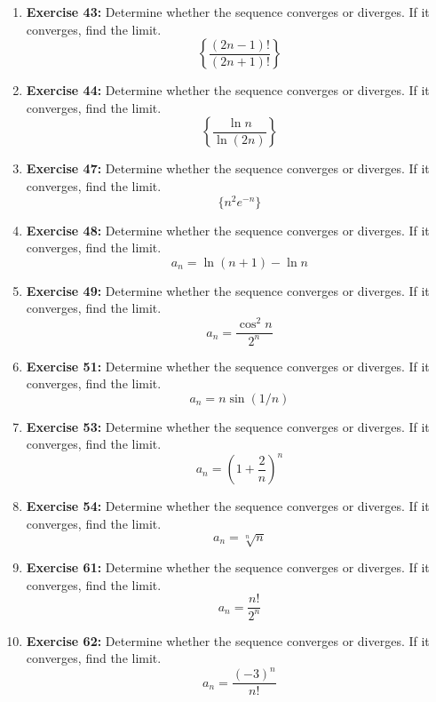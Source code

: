 \documentclass[12pt, a4paper]{article}
\begin{document}
\begin{enumerate}
    \item \textbf{Exercise 43:} Determine whether the sequence converges or diverges. If it converges, find the limit.
    \[ \left\{ \frac{(2n-1)!}{(2n+1)!} \right\} \]
    
    \item \textbf{Exercise 44:} Determine whether the sequence converges or diverges. If it converges, find the limit.
    \[ \left\{ \frac{\ln n}{\ln(2n)} \right\} \]

    \item \textbf{Exercise 47:} Determine whether the sequence converges or diverges. If it converges, find the limit.
    \[ \{ n^2 e^{-n} \} \]
    
    \item \textbf{Exercise 48:} Determine whether the sequence converges or diverges. If it converges, find the limit.
    \[ a_n = \ln(n+1) - \ln n \]

    \item \textbf{Exercise 49:} Determine whether the sequence converges or diverges. If it converges, find the limit.
    \[ a_n = \frac{\cos^2 n}{2^n} \]

    \item \textbf{Exercise 51:} Determine whether the sequence converges or diverges. If it converges, find the limit.
    \[ a_n = n \sin(1/n) \]
    
    \item \textbf{Exercise 53:} Determine whether the sequence converges or diverges. If it converges, find the limit.
    \[ a_n = \left(1 + \frac{2}{n}\right)^n \]

    \item \textbf{Exercise 54:} Determine whether the sequence converges or diverges. If it converges, find the limit.
    \[ a_n = \sqrt[n]{n} \]
    
    \item \textbf{Exercise 61:} Determine whether the sequence converges or diverges. If it converges, find the limit.
    \[ a_n = \frac{n!}{2^n} \]

    \item \textbf{Exercise 62:} Determine whether the sequence converges or diverges. If it converges, find the limit.
    \[ a_n = \frac{(-3)^n}{n!} \]
\end{enumerate}

\hrulefill
\vspace{1em}
\end{document}

